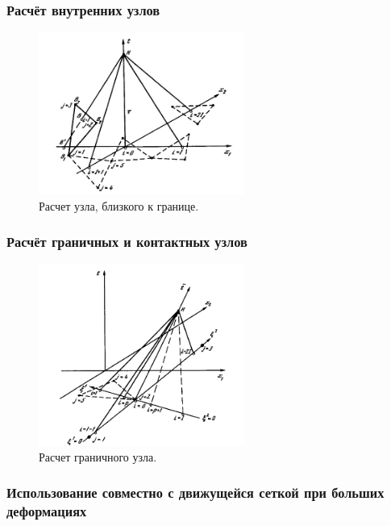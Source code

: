 \subsubsection{Расчёт внутренних узлов}


\begin{figure}[htp]
\centering
\includegraphics[width=0.6\textwidth]{png/characteristics-2d-triangles-semi-border.png}
\caption{Расчет узла, близкого к границе.}
\end{figure}


\subsubsection{Расчёт граничных и контактных узлов}

\begin{figure}[htp]
\centering
\includegraphics[width=0.6\textwidth]{png/characteristics-2d-triangles-border.png}
\caption{Расчет граничного узла.}
\end{figure}

\clearpage
\newpage

\subsubsection{Использование совместно с движущейся сеткой при больших деформациях}

